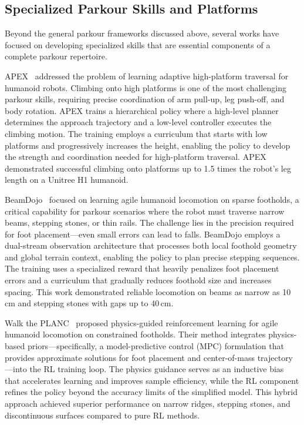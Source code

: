 \subsection{Specialized Parkour Skills and Platforms}

Beyond the general parkour frameworks discussed above, several works have focused on developing specialized skills that are essential components of a complete parkour repertoire.

APEX~\cite{wang2024apex} addressed the problem of learning adaptive high-platform traversal for humanoid robots. Climbing onto high platforms is one of the most challenging parkour skills, requiring precise coordination of arm pull-up, leg push-off, and body rotation. APEX trains a hierarchical policy where a high-level planner determines the approach trajectory and a low-level controller executes the climbing motion. The training employs a curriculum that starts with low platforms and progressively increases the height, enabling the policy to develop the strength and coordination needed for high-platform traversal. APEX demonstrated successful climbing onto platforms up to 1.5 times the robot's leg length on a Unitree H1 humanoid.

BeamDojo~\cite{wang2024beamdojo} focused on learning agile humanoid locomotion on sparse footholds, a critical capability for parkour scenarios where the robot must traverse narrow beams, stepping stones, or thin rails. The challenge lies in the precision required for foot placement---even small errors can lead to falls. BeamDojo employs a dual-stream observation architecture that processes both local foothold geometry and global terrain context, enabling the policy to plan precise stepping sequences. The training uses a specialized reward that heavily penalizes foot placement errors and a curriculum that gradually reduces foothold size and increases spacing. This work demonstrated reliable locomotion on beams as narrow as 10\,cm and stepping stones with gaps up to 40\,cm.

Walk the PLANC~\cite{dai2024walkplanc} proposed physics-guided reinforcement learning for agile humanoid locomotion on constrained footholds. Their method integrates physics-based priors---specifically, a model-predictive control (MPC) formulation that provides approximate solutions for foot placement and center-of-mass trajectory---into the RL training loop. The physics guidance serves as an inductive bias that accelerates learning and improves sample efficiency, while the RL component refines the policy beyond the accuracy limits of the simplified model. This hybrid approach achieved superior performance on narrow ridges, stepping stones, and discontinuous surfaces compared to pure RL methods.

